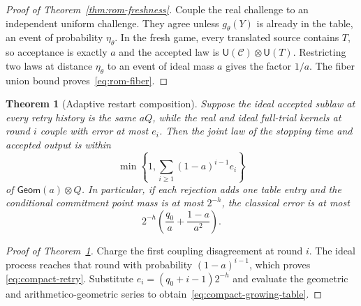 \documentclass[pdflatex,sn-mathphys-num]{sn-jnl}
\theoremstyle{thmstyleone}
\newtheorem{theorem}{Theorem}[section]
\theoremstyle{thmstyletwo}
\newcommand{\Unif}{\mathsf{U}}
\newcommand{\Geom}{\mathsf{Geom}}
\begin{document}
\begin{proof}[Proof of Theorem~\ref{thm:rom-freshness}]
Couple the real challenge to an independent uniform challenge.  They agree
unless $g_\theta(Y)$ is already in the table, an event of probability
$\eta_\theta$.  In the fresh game, every translated source contains $T$, so
acceptance is exactly $a$ and the accepted law is
$\Unif(\mathcal C)\otimes\Unif(T)$.  Restricting two laws at distance
$\eta_\theta$ to an event of ideal mass $a$ gives the factor $1/a$.
The fiber union bound proves~\eqref{eq:rom-fiber}.
\end{proof}

\begin{theorem}[Adaptive restart composition]
\label{thm:retry-composition}
Suppose the ideal accepted sublaw at every retry history is the same $aQ$,
while the real and ideal full-trial kernels at round $i$ couple with error at
most $e_i$.  Then the joint law of the stopping time and accepted output is
within
\begin{equation}
 \min\left\{1,\sum_{i\ge1}(1-a)^{i-1}e_i\right\}
 \label{eq:compact-retry}
\end{equation}
of $\Geom(a)\otimes Q$.  In particular, if each rejection adds one table
entry and the conditional commitment point mass is at most $2^{-h}$, the
classical error is at most
\begin{equation}
 2^{-h}\left(\frac{q_0}{a}+\frac{1-a}{a^2}\right).
 \label{eq:compact-growing-table}
\end{equation}
\end{theorem}

\begin{proof}[Proof of Theorem~\ref{thm:retry-composition}]
Charge the first coupling disagreement at round $i$.  The ideal process
reaches that round with probability $(1-a)^{i-1}$, which proves
\eqref{eq:compact-retry}.  Substitute
$e_i=(q_0+i-1)2^{-h}$ and evaluate the geometric and arithmetico-geometric
series to obtain~\eqref{eq:compact-growing-table}.
\end{proof}
\end{document}
